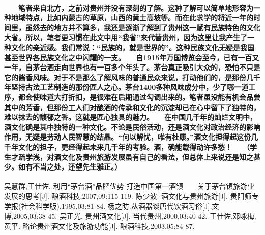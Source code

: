 \documentclass[12pt,a4paper]{ctexart} %
\begin{document}
\paragraph{\textnormal{\newline 　　笔者来自北方，之前对贵州并没有深刻的了解。这种了解可以简单地形容为一种地域特点，比如内蒙古的草原，山西的黄土高坡等。而在此求学的将近一年的时间里，虽然去的地方并不算多，我还是逐渐了解到了贵州这一赋有民族特色的文化大省。所以，笔者更习惯在此文中用“我省”来代替贵州，因为这里让我产生了一种文化的亲近感。我们常说：“民族的，就是世界的”。这种民族文化无疑是我国甚至世界各民族文化之中闪耀的一支。\newline 　　自1915年万国博览会至今，已有一百又一年，自茅台酒走向世界也有一百多个年头了。茅台真正吸引大众的，恐怕不只是它的酱香风味。对于不是那么了解风味的普通民众来说，打动他们的，是那份几千年坚持古法工艺制造的那份匠人之心。茅台1400多种风味成分中，少了哪一道工序，都会使味道大打折扣，是很难在后期通过勾调出来的。笔者虽没能有机会品尝其中的芳香，但那份工人们对酿酒的传承和文化的沉淀却已在心中留下了独特的，难以抹去的馥郁之香。这就是匠心独具的魅力。\newline 　　在中国几千年的灿烂文明中，酒文化确是其中独特的一种文化。不论是民俗活动，还是酒文化对政治经济的影响作用，无疑是劳动人民智慧的结晶。“何以解忧，唯有杜康。”酒文化担得起这份几千年文化的担子，更经得起未来几千年的考验。酒，确能载得动许多愁！\newline 　　（学生才疏学浅，对酒文化及贵州旅游发展虽有自己的看法，但总体上来说还是知之甚少。如有不当之处，还望先生雅正。）
}}

\clearpage
\begin{thebibliography}{5}
     \textnormal{吴慧群,王仕佐. 利用“茅台酒”品牌优势 打造中国第一酒镇——关于茅台镇旅游业发展的思考[J]. 酿酒科技,2007,09:115-119.}
     \textnormal{陈少波. 酒文化与贵州旅游[J]. 贵阳师专学报(社会科学版),1995,03:81-84.}
    \textnormal{杨之昉.从酒器谈唐代饮酒习俗[J].文博,2005,03:38-45.}
     \textnormal{吴正光. 贵州酒文化[J]. 当代贵州,2000,03:40-42.}
     \textnormal{王仕佐,邓咏梅,黄平. 略论贵州酒文化及旅游功能[J]. 酿酒科技,2003,05:84-87.}
\end{thebibliography}
\end{document}

